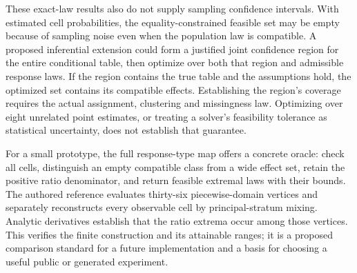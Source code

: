 These exact-law results also do not supply sampling confidence intervals.
With estimated cell probabilities, the equality-constrained feasible set
may be empty because of sampling noise even when the population law is
compatible. A proposed inferential extension could form a justified joint
confidence region for the entire conditional table, then optimize over
both that region and admissible response laws. If the region contains
the true table and the assumptions hold, the optimized set contains its
compatible effects. Establishing the region's coverage requires the actual
assignment, clustering and missingness law. Optimizing over eight unrelated
point estimates, or treating a solver's feasibility tolerance as statistical
uncertainty, does not establish that guarantee.

For a small prototype, the full response-type map offers a concrete oracle:
check all cells, distinguish an empty compatible class from a wide effect
set, retain the positive ratio denominator, and return feasible extremal
laws with their bounds. The authored reference evaluates thirty-six
piecewise-domain vertices and separately reconstructs every observable
cell by principal-stratum mixing. Analytic derivatives establish that
the ratio extrema occur among those vertices. This verifies the finite
construction and its attainable ranges; it is a proposed comparison
standard for a future implementation and a basis for choosing a useful
public or generated experiment.\citep{exec17_s3_sensitivity}
\label{exec17:s3-sensitivity-end}
